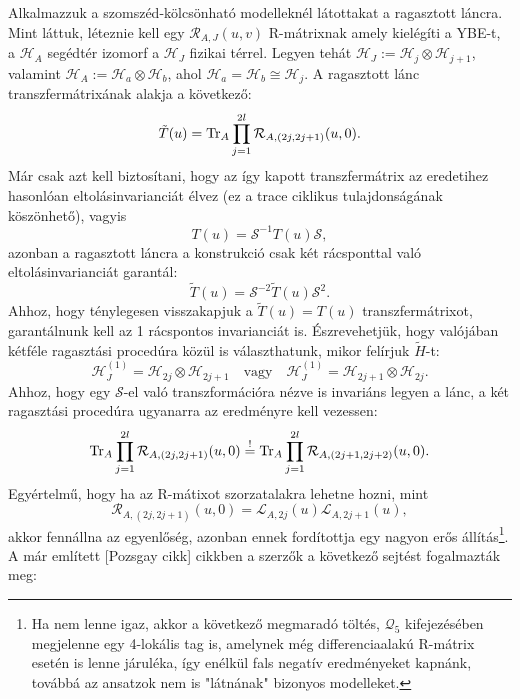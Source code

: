 \documentclass[12pt,a4paper,oneside]{report}
\newcommand{\R}{\mathcal{R}}
\renewcommand{\L}{\mathcal{L}}
\newcommand{\Q}{\mathcal{Q}}
\newcommand{\Shift}{\mathcal{S}}
\newcommand{\Htil}{\tilde{H}}
\newcommand{\Hil}{\mathscr{H}}
\begin{document}
Alkalmazzuk a szomszéd-kölcsönható modelleknél látottakat a ragasztott láncra. Mint láttuk, léteznie kell egy $\R_{A, J}(u,v)$ R-mátrixnak amely kielégíti a YBE-t, a $\Hil_A$ segédtér izomorf a $\Hil_{J}$ fizikai térrel. Legyen tehát $\Hil_J:=\Hil_{j}\otimes \Hil_{j+1}$, valamint $\Hil_A:=\Hil_a\otimes\Hil_b$, ahol $\Hil_{a}=\Hil_b\cong \Hil_j$. A ragasztott lánc transzfermátrixának alakja a következő:
\begin{equation}\label{eq:trans_glued}
    \tilde{T}(u)=\Tr_A\prod_{j=1}^{2l}\R_{A,(2j,2j+1)}(u,0).
\end{equation}
Már csak azt kell biztosítani, hogy az így kapott transzfermátrix az eredetihez hasonlóan eltolásinvarianciát élvez (ez a trace ciklikus tulajdonságának köszönhető), vagyis
\begin{equation}
    T(u)=\Shift^{-1}T(u)\Shift,
\end{equation}
azonban a ragasztott láncra a konstrukció csak két rácsponttal való eltolásinvarianciát garantál:
\begin{equation}
    \tilde{T}(u)=\Shift^{-2}\tilde{T}(u)\Shift^2.
\end{equation}
Ahhoz, hogy ténylegesen visszakapjuk a $\tilde{T}(u)=T(u)$ transzfermátrixot, garantálnunk kell az 1 rácspontos invarianciát is. Észrevehetjük, hogy valójában kétféle ragasztási procedúra közül is választhatunk, mikor felírjuk $\Htil$-t:
\begin{equation}
    \Hil_J^{(1)}=\Hil_{2j}\otimes \Hil_{2j+1} \quad \text{vagy}\quad \Hil_J^{(1)}=\Hil_{2j+1}\otimes \Hil_{2j}.
\end{equation}
Ahhoz, hogy egy $\Shift$-el való transzformációra nézve is invariáns legyen a lánc, a két ragasztási procedúra ugyanarra az eredményre kell vezessen:
\begin{equation}
    \Tr_A\prod_{j=1}^{2l}\R_{A,(2j,2j+1)}(u,0)\stackrel{!}{=}\Tr_A\prod_{j=1}^{2l}\R_{A,(2j+1,2j+2)}(u,0).
\end{equation}
Egyértelmű, hogy ha az R-mátixot szorzatalakra lehetne hozni, mint
\begin{equation}
    \R_{A,(2j,2j+1)}(u,0)=\L_{A,2j}(u)\L_{A,2j+1}(u),
\end{equation}
akkor fennállna az egyenlőség, azonban ennek fordítottja egy nagyon erős állítás\footnote{Ha nem lenne igaz, akkor a következő megmaradó töltés, $\Q_5$ kifejezésében megjelenne egy 4-lokális tag is, amelynek még differenciaalakú R-mátrix esetén is lenne járuléka, így enélkül fals negatív eredményeket kapnánk, továbbá az ansatzok nem is "látnának" bizonyos modelleket.}. A már említett [Pozsgay cikk] cikkben a szerzők a következő sejtést fogalmazták meg:
\end{document}
